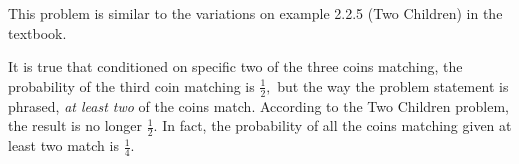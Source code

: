 This problem is similar to the variations on example 2.2.5 (Two Children) in the
textbook.

It is true that conditioned on specific two of the three coins matching, the
probability of the third coin matching is $\frac{1}{2},$ but the way the problem
statement is phrased, \textit{at least two} of the coins match. According to the
Two Children problem, the result is no longer $\frac{1}{2}.$ In fact,
the probability of all the coins matching given at least two match is $\frac{1}
{4}.$